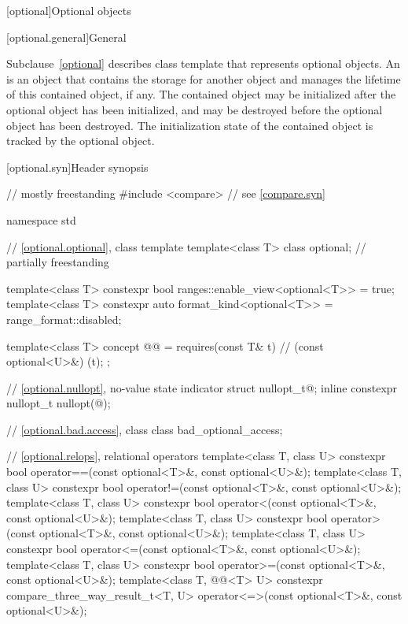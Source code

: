 [optional]{Optional objects}

[optional.general]{General}

\pnum
Subclause~\ref{optional} describes class template  that represents
optional objects.
An  is an
object that contains the storage for another object and manages the lifetime of
this contained object, if any. The contained object may be initialized after
the optional object has been initialized, and may be destroyed before the
optional object has been destroyed. The initialization state of the contained
object is tracked by the optional object.

[optional.syn]{Header  synopsis}

%
\begin{codeblock}
// mostly freestanding
#include <compare>              // see \ref{compare.syn}

namespace std {
  // \ref{optional.optional}, class template 
  template<class T>
    class optional;                                                     // partially freestanding

  template<class T>
    constexpr bool ranges::enable_view<optional<T>> = true;
  template<class T>
    constexpr auto format_kind<optional<T>> = range_format::disabled;

  template<class T>
    concept @@ = requires(const T& t) {       // (const optional<U>&){ }(t);
    };

  // \ref{optional.nullopt}, no-value state indicator
  struct nullopt_t{@\seebelow@};
  inline constexpr nullopt_t nullopt(@\unspec@);

  // \ref{optional.bad.access}, class 
  class bad_optional_access;

  // \ref{optional.relops}, relational operators
  template<class T, class U>
    constexpr bool operator==(const optional<T>&, const optional<U>&);
  template<class T, class U>
    constexpr bool operator!=(const optional<T>&, const optional<U>&);
  template<class T, class U>
    constexpr bool operator<(const optional<T>&, const optional<U>&);
  template<class T, class U>
    constexpr bool operator>(const optional<T>&, const optional<U>&);
  template<class T, class U>
    constexpr bool operator<=(const optional<T>&, const optional<U>&);
  template<class T, class U>
    constexpr bool operator>=(const optional<T>&, const optional<U>&);
  template<class T, @@<T> U>
    constexpr compare_three_way_result_t<T, U>
      operator<=>(const optional<T>&, const optional<U>&);

}
\end{codeblock}
